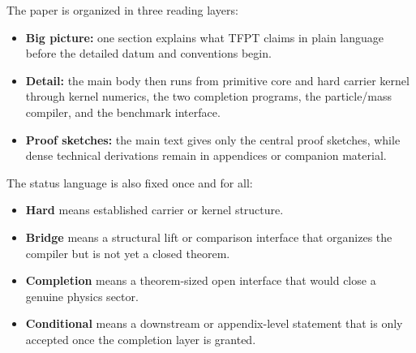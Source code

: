 \documentclass[11pt,a4paper]{article}
\theoremstyle{definition}
\theoremstyle{remark}
\begin{document}
The paper is organized in three reading layers:
\begin{itemize}[leftmargin=1.5em, topsep=3pt, itemsep=2pt]
    \item \textbf{Big picture:} one section explains what TFPT claims in plain language before the detailed datum and conventions begin.
    \item \textbf{Detail:} the main body then runs from primitive core and hard carrier kernel through kernel numerics, the two completion programs, the particle/mass compiler, and the benchmark interface.
    \item \textbf{Proof sketches:} the main text gives only the central proof sketches, while dense technical derivations remain in appendices or companion material.
\end{itemize}
The status language is also fixed once and for all:
\begin{itemize}[leftmargin=1.5em, topsep=3pt, itemsep=2pt]
    \item \textbf{Hard} means established carrier or kernel structure.
    \item \textbf{Bridge} means a structural lift or comparison interface that organizes the compiler but is not yet a closed theorem.
    \item \textbf{Completion} means a theorem-sized open interface that would close a genuine physics sector.
    \item \textbf{Conditional} means a downstream or appendix-level statement that is only accepted once the completion layer is granted.
\end{itemize}
\end{document}
